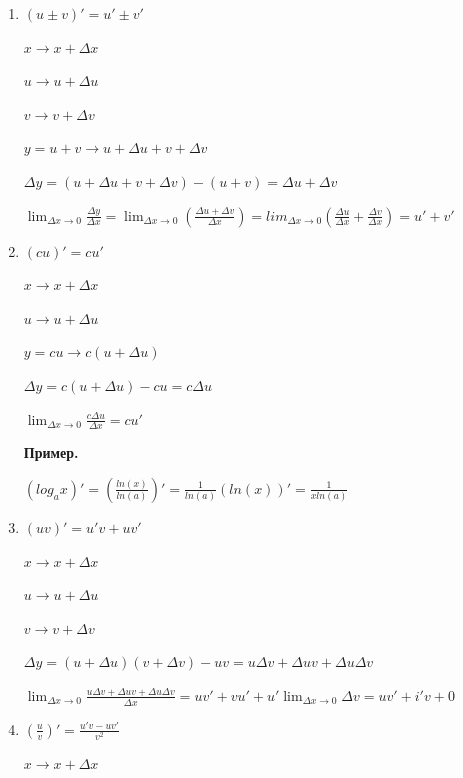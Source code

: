 \documentclass{article}
\begin{document}
    \begin{enumerate}
        \item \( (u \pm v)' = u' \pm v' \)
        
            \( x \to x + \Delta x \)

            \( u \to u + \Delta u \)

            \( v \to v + \Delta v \)

            \( y = u + v \to u + \Delta u + v + \Delta v \)

            \( \Delta y = (u + \Delta u + v + \Delta v) - (u + v) = \Delta u + \Delta v \)

            \( \lim_{\Delta x \to 0} \frac{\Delta y}{\Delta x} = \lim_{\Delta x \to 0} (\frac{\Delta u + \Delta v}{\Delta x}) = lim_{\Delta x \to 0} (\frac{\Delta u}{\Delta x} + \frac{\Delta v}{\Delta x}) = u' + v' \)

        \item \( (cu)' = cu' \)
        
            \( x \to x + \Delta x \)

            \( u \to u + \Delta u \)

            \( y = cu \to c(u + \Delta u) \)

            \( \Delta y = c(u + \Delta u) - cu = c\Delta u \)

            \( \lim_{\Delta x \to 0} \frac{c\Delta u}{\Delta x} = cu' \)

            \textbf{Пример.}

            \((log_a x)' = (\frac{ln(x)}{ln(a)})' = \frac{1}{ln(a)}(ln(x))' = \frac{1}{x ln(a)} \)

        \item \( (uv)' = u'v + uv' \)
        
            \( x \to x + \Delta x \)

            \( u \to u + \Delta u \)

            \( v \to v + \Delta v \)

            \( \Delta y = (u + \Delta u)(v + \Delta v) - uv = u\Delta v + \Delta uv + \Delta u \Delta v \)

            \(\lim_{\Delta x \to 0}{\frac{u\Delta v + \Delta u v + \Delta u \Delta v}{\Delta x}} = uv' + vu' + u'\lim_{\Delta x \to 0}{\Delta v} = uv' + i'v + 0\)

        \item \( (\frac{u}{v})' = \frac{u'v - uv'}{v^2}  \)
        
            \( x \to x + \Delta x \)
            

\end{enumerate}
\end{document}
